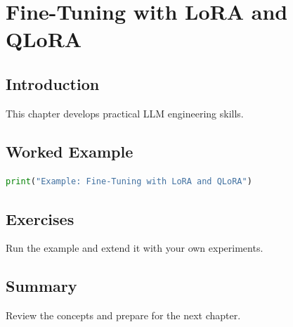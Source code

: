 \chapter{Fine-Tuning with LoRA and QLoRA}
\label{chap:vol9-9}



\section{Introduction}
This chapter develops practical LLM engineering skills.

\section{Worked Example}
\begin{lstlisting}[language=Python]
print("Example: Fine-Tuning with LoRA and QLoRA")
\end{lstlisting}

\section{Exercises}
\begin{exercise}
Run the example and extend it with your own experiments.
\end{exercise}

\section{Summary}
Review the concepts and prepare for the next chapter.
